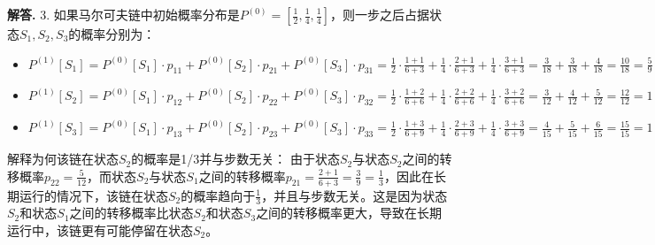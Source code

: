 \documentclass[12pt, a4paper, oneside]{ctexart}
\newenvironment{solution}{\par\noindent\textbf{解答. }}{\par}
\begin{document}
\begin{solution}
    3. 如果马尔可夫链中初始概率分布是$P^{(0)}=[\frac{1}{2},\frac{1}{4},\frac{1}{4}]$，则一步之后占据状态$S_1,S_2,S_3$的概率分别为：
    \begin{itemize}
        \item $P^{(1)}[S_1] = P^{(0)}[S_1] \cdot p_{11} + P^{(0)}[S_2] \cdot p_{21} + P^{(0)}[S_3] \cdot p_{31} = \frac{1}{2} \cdot \frac{1+1}{6+3} + \frac{1}{4} \cdot \frac{2+1}{6+3} + \frac{1}{4} \cdot \frac{3+1}{6+3} = \frac{3}{18} + \frac{3}{18} + \frac{4}{18} = \frac{10}{18} = \frac{5}{9}$
        \item $P^{(1)}[S_2] = P^{(0)}[S_1] \cdot p_{12} + P^{(0)}[S_2] \cdot p_{22} + P^{(0)}[S_3] \cdot p_{32} = \frac{1}{2} \cdot \frac{1+2}{6+6} + \frac{1}{4} \cdot \frac{2+2}{6+6} + \frac{1}{4} \cdot \frac{3+2}{6+6} = \frac{3}{12} + \frac{4}{12} + \frac{5}{12} = \frac{12}{12} = 1$
        \item $P^{(1)}[S_3] = P^{(0)}[S_1] \cdot p_{13} + P^{(0)}[S_2] \cdot p_{23} + P^{(0)}[S_3] \cdot p_{33} = \frac{1}{2} \cdot \frac{1+3}{6+9} + \frac{1}{4} \cdot \frac{2+3}{6+9} + \frac{1}{4} \cdot \frac{3+3}{6+9} = \frac{4}{15} + \frac{5}{15} + \frac{6}{15} = \frac{15}{15} = 1$
    \end{itemize}
    
    解释为何该链在状态$S_2$的概率是1/3并与步数无关：
    由于状态$S_2$与状态$S_2$之间的转移概率$p_{22} = \frac{5}{12}$，而状态$S_2$与状态$S_1$之间的转移概率$p_{21} = \frac{2+1}{6+3} = \frac{3}{9} = \frac{1}{3}$，因此在长期运行的情况下，该链在状态$S_2$的概率趋向于$\frac{1}{3}$，并且与步数无关。这是因为状态$S_2$和状态$S_1$之间的转移概率比状态$S_2$和状态$S_3$之间的转移概率更大，导致在长期运行中，该链更有可能停留在状态$S_2$。
\end{solution}
\end{document}
